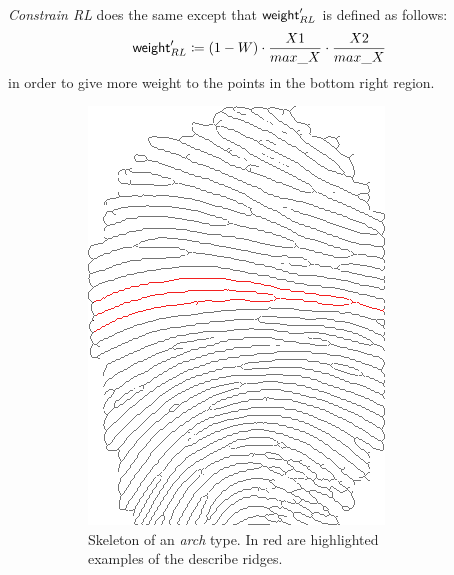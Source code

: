\documentclass[8pt]{article}
\begin{document}
\emph{Constrain RL} does the same except that $\textsf{weight}_{RL}^\prime$ is
defined as follows:
  \begin{align*}
    \textsf{weight}_{RL}^\prime \coloneqq 
      (1-W)\cdot \frac{X1}{max\_X} \cdot \frac{X2}{max\_X}
  \end{align*}
in order to give more weight to the points in the bottom right region.
\begin{figure}
	\centering
   	\begin{subfigure}{.38\textwidth}
   			\centering
	\includegraphics[width=0.9\linewidth]{img/arch}
	\caption{Skeleton of an \textit{arch} type. In red are highlighted examples of the describe ridges.}
	\label{fig:arch}
\end{subfigure}%
\hfill
\begin{subfigure}{.38\textwidth}
	\centering

\end{subfigure}
\end{figure}
\end{document}
